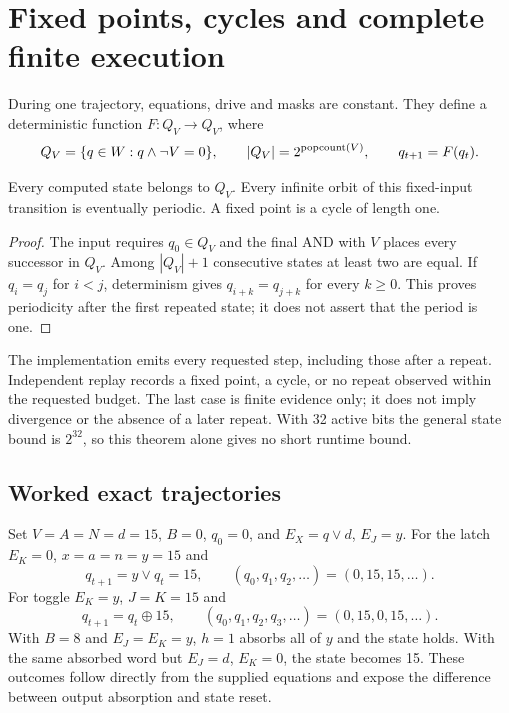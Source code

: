 \section{Fixed points, cycles and complete finite execution}
During one trajectory, equations, drive and masks are constant. They define a
deterministic function $F:Q_V\to Q_V$, where
\begin{equation}
Q_V=\{q\in W:q\land\neg V=0\},\qquad |Q_V|=2^{\operatorname{popcount}(V)},\qquad
q_{t+1}=F(q_t).
\end{equation}
\begin{proposition}
Every computed state belongs to $Q_V$. Every infinite orbit of this fixed-input
transition is eventually periodic. A fixed point is a cycle of length one.
\end{proposition}
\begin{proof}
The input requires $q_0\in Q_V$ and the final AND with $V$ places every successor
in $Q_V$. Among $|Q_V|+1$ consecutive states at least two are equal. If
$q_i=q_j$ for $i<j$, determinism gives $q_{i+k}=q_{j+k}$ for every $k\ge0$.
This proves periodicity after the first repeated state; it does not assert
that the period is one.
\end{proof}
The implementation emits every requested step, including those after a repeat.
Independent replay records a fixed point, a cycle, or no repeat observed within
the requested budget. The last case is finite evidence only; it does not imply
divergence or the absence of a later repeat. With 32 active bits the general
state bound is $2^{32}$, so this theorem alone gives no short runtime bound.

\subsection{Worked exact trajectories}
Set $V=A=N=d=15$, $B=0$, $q_0=0$, and $E_X=q\lor d$, $E_J=y$.
For the latch $E_K=0$, $x=a=n=y=15$ and
\begin{equation}
q_{t+1}=y\lor q_t=15,\qquad (q_0,q_1,q_2,\ldots)=(0,15,15,\ldots).
\end{equation}
For toggle $E_K=y$, $J=K=15$ and
\begin{equation}
q_{t+1}=q_t\mathbin{\oplus}15,\qquad
(q_0,q_1,q_2,q_3,\ldots)=(0,15,0,15,\ldots).
\end{equation}
With $B=8$ and $E_J=E_K=y$, $h=1$ absorbs all of $y$ and the state holds.
With the same absorbed word but $E_J=d$, $E_K=0$, the state becomes 15.
These outcomes follow directly from the supplied equations and expose the
difference between output absorption and state reset.


